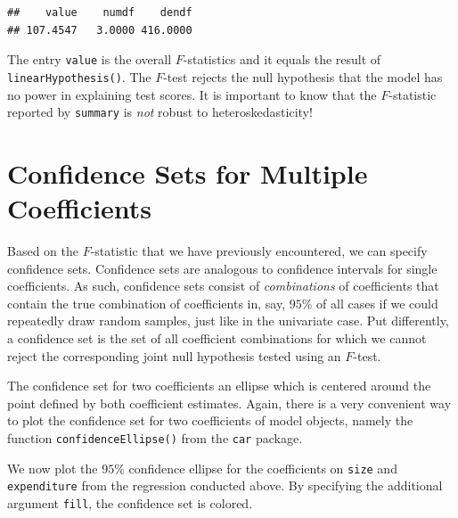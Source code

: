\documentclass[]{book}
\newenvironment{Shaded}{\begin{snugshade}}{\end{snugshade}}
\newcommand{\KeywordTok}[1]{\textcolor[rgb]{0.13,0.29,0.53}{\textbf{#1}}}
\newcommand{\DataTypeTok}[1]{\textcolor[rgb]{0.13,0.29,0.53}{#1}}
\newcommand{\StringTok}[1]{\textcolor[rgb]{0.31,0.60,0.02}{#1}}
\newcommand{\CommentTok}[1]{\textcolor[rgb]{0.56,0.35,0.01}{\textit{#1}}}
\newcommand{\OperatorTok}[1]{\textcolor[rgb]{0.81,0.36,0.00}{\textbf{#1}}}
\newcommand{\NormalTok}[1]{#1}
\theoremstyle{definition}
\theoremstyle{definition}
\theoremstyle{definition}
\theoremstyle{remark}
\begin{document}
\begin{Shaded}
\end{Shaded}

\begin{verbatim}
##    value    numdf    dendf 
## 107.4547   3.0000 416.0000
\end{verbatim}

The entry \texttt{value} is the overall \(F\)-statistics and it equals
the result of \texttt{linearHypothesis()}. The \(F\)-test rejects the
null hypothesis that the model has no power in explaining test scores.
It is important to know that the \(F\)-statistic reported by
\texttt{summary} is \emph{not} robust to heteroskedasticity!

\section{Confidence Sets for Multiple
Coefficients}\label{confidence-sets-for-multiple-coefficients}

Based on the \(F\)-statistic that we have previously encountered, we can
specify confidence sets. Confidence sets are analogous to confidence
intervals for single coefficients. As such, confidence sets consist of
\emph{combinations} of coefficients that contain the true combination of
coefficients in, say, \(95\%\) of all cases if we could repeatedly draw
random samples, just like in the univariate case. Put differently, a
confidence set is the set of all coefficient combinations for which we
cannot reject the corresponding joint null hypothesis tested using an
\(F\)-test.

The confidence set for two coefficients an ellipse which is centered
around the point defined by both coefficient estimates. Again, there is
a very convenient way to plot the confidence set for two coefficients of
model objects, namely the function \texttt{confidenceEllipse()} from the
\texttt{car} package.

We now plot the \(95\%\) confidence ellipse for the coefficients on
\texttt{size} and \texttt{expenditure} from the regression conducted
above. By specifying the additional argument \texttt{fill}, the
confidence set is colored.

\begin{Shaded}
\end{Shaded}
\end{document}
